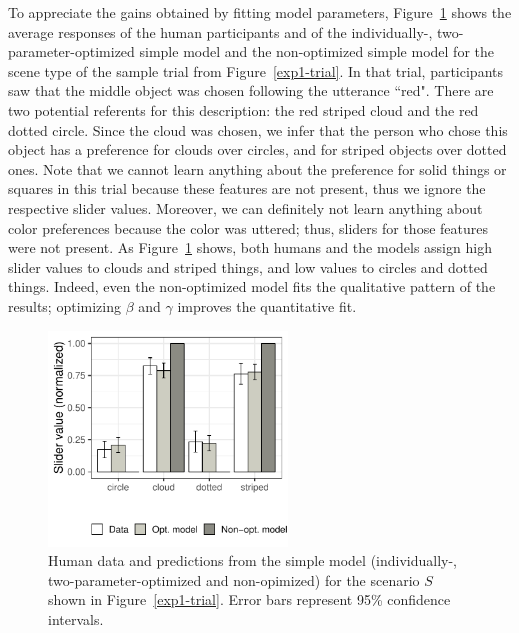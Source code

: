 \documentclass[11pt,a4paper]{article}
\begin{document}
To appreciate the gains obtained by fitting model parameters, Figure~\ref{barplot_x4} shows the average responses of the human participants and of the individually-, two-parameter-optimized simple model and the non-optimized simple model for the scene type of the sample trial from Figure~\ref{exp1-trial}.
In that trial, participants saw that the middle object was chosen following the utterance ``red". There are two potential referents for this description: the red striped cloud and the red dotted circle. Since the cloud was chosen, we infer that the person who chose this object has a preference for clouds over circles, and for striped objects over dotted ones. 
Note that we cannot learn anything about the preference for solid things or squares in this trial because these features are not present, thus we ignore the respective slider values. 
Moreover, we can definitely not learn anything about color preferences because the color was uttered; thus, sliders for those features were not present.  
As Figure~\ref{barplot_x4} shows, both humans and the models assign high slider values to clouds and striped things, and low values to circles and dotted things. Indeed, even the non-optimized model fits the qualitative pattern of the results; optimizing $\beta$ and $\gamma$ improves the quantitative fit.


\begin{figure}[ht!]
	\centering
	\includegraphics[width=2.5in]{images/december_barplot_x4.pdf}
	\caption{Human data and predictions from the simple model (individually-, two-parameter-optimized and non-opimized) for the scenario $S$ shown in Figure~\ref{exp1-trial}. Error bars represent 95\% confidence intervals.}\label{barplot_x4}
\end{figure}
\end{document}
